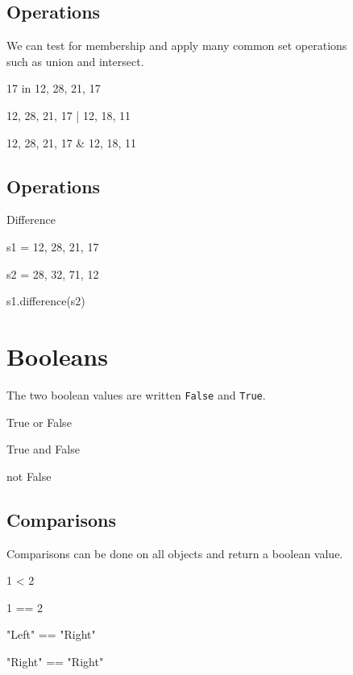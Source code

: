 \documentclass[aspectratio=1610,slidestop]{beamer}
\begin{document}
\subsection{Operations}
\begin{pframe}
 We can test for membership and apply many common set operations\\
 such as union and intersect.
 \medskip

\begin{pyconsole}
17 in {12, 28, 21, 17}

{12, 28, 21, 17} | {12, 18, 11}

{12, 28, 21, 17} & {12, 18, 11}
\end{pyconsole}
\end{pframe}


\subsection{Operations}
\begin{pframe}
 Difference
 \medskip

\begin{pyconsole}
s1 = {12, 28, 21, 17}

s2 = {28, 32, 71, 12}

s1.difference(s2)
\end{pyconsole}
\end{pframe}


\section{Booleans}
\begin{pframe}
  The two boolean values are written \texttt{False} and
  \texttt{True}.
\begin{pyconsole}
True or False

True and False

not False
\end{pyconsole}
\end{pframe}


\subsection{Comparisons}
\begin{pframe}
  Comparisons can be done on all objects and return a boolean value.
\begin{pyconsole}
1 < 2

1 == 2

"Left" == "Right"

"Right" == "Right"
\end{pyconsole}
\end{pframe}
\end{document}
